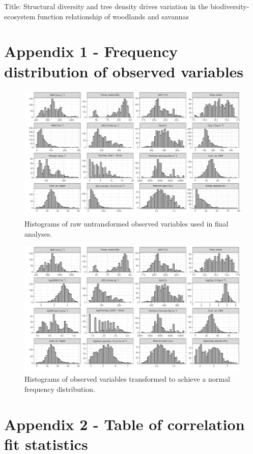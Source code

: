 \documentclass[11pt,a4paper]{article}
\newcommand{\titletext}{Structural diversity and tree density drives variation in the biodiversity-ecosystem function relationship of woodlands and savannas}
\begin{document}
{\Large{Title: \titletext{}}}

\section{Appendix 1 - Frequency distribution of observed variables} \label{appendixa}

\begin{figure}[H]
\centering
	\includegraphics[width=\textwidth]{hist_raw}
	\caption{Histograms of raw untransformed observed variables used in final analyses.}
	\label{hist_raw}
\end{figure}

\begin{figure}[H]
\centering
	\includegraphics[width=\textwidth]{hist_trans}
	\caption{Histograms of observed variables transformed to achieve a normal frequency distribution.}
	\label{hist_trans}
\end{figure}

\appendix{}
\section{Appendix 2 - Table of correlation fit statistics} \label{appendixb}
\end{document}
